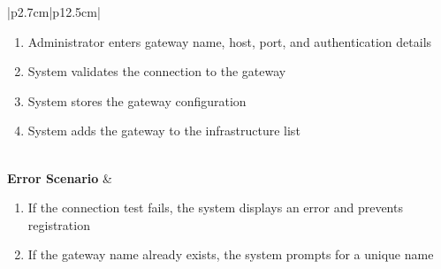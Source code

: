 \begin{table}[H]
\begin{tabular}{|p{2.7cm}|p{12.5cm}|}
\begin{minipage}[t]{\linewidth}
\begin{enumerate}[topsep=0pt,itemsep=1pt,parsep=0pt,partopsep=0pt]
                                          \item Administrator enters gateway name, host, port, and authentication details
                                          \item System validates the connection to the gateway
                                          \item System stores the gateway configuration
                                          \item System adds the gateway to the infrastructure list
                                      \end{enumerate}
                                  \end{minipage}       \\
        \hline
        \textbf{Error Scenario} & \begin{minipage}[t]{\linewidth}
                                      \begin{enumerate}[topsep=0pt,itemsep=1pt,parsep=0pt,partopsep=0pt]
                                          \item If the connection test fails, the system displays an error and prevents
                                                registration
                                          \item If the gateway name already exists, the system prompts for a unique name
                                      \end{enumerate}
                                  \end{minipage}        \\
        \hline
    \end{tabular}
    \label{tab:admin-add-gateway}
\end{table}

